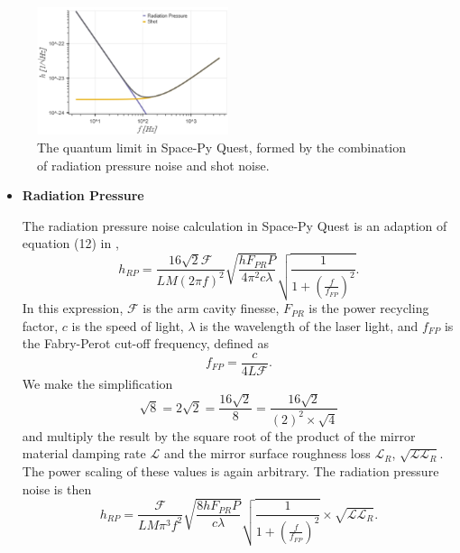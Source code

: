 \documentclass{article}
\begin{document}
\begin{itemize}
    \begin{figure}[h!]
    \centering
    \includegraphics[width=0.5\textwidth]{SPQ_aLIGO_quantum.pdf}
    \caption{The quantum limit in Space-Py Quest, formed by the combination of radiation pressure noise and shot noise.}
    \label{fig:quantum}
    \end{figure}
    \begin{itemize}
        \item \textbf{Radiation Pressure} \par
    The radiation pressure noise calculation in Space-Py Quest is an adaption of equation (12) in \cite{VIRGO}, 
    \[
    h_{RP} = \frac{16\sqrt{2}\mathcal{F}}{LM(2\pi f)^2}\sqrt{\frac{hF_{PR}P}{4\pi^2c\lambda}}\sqrt{\frac{1}{1 + \left(\frac{f}{f_{FP}}\right)^2}}.
    \]
    In this expression, $\mathcal{F}$ is the arm cavity finesse, $F_{PR}$ is the power recycling factor, $c$ is the speed of light, $\lambda$ is the wavelength of the laser light, and $f_{FP}$ is the Fabry-Perot cut-off frequency, defined as
    \begin{equation}
        f_{FP} = \frac{c}{4L\mathcal{F}}.
    \end{equation}
    We make the simplification
    \[
    \sqrt{8} = 2\sqrt{2} = \frac{16 \sqrt{2}}{8} = \frac{16 \sqrt{2}}{(2)^2 \times \sqrt{4}}
    \]
   and multiply the result by the square root of the product of the mirror material damping rate $\mathcal{L}$ and the mirror surface roughness loss $\mathcal{L}_R$, $\sqrt{\mathcal{L}\mathcal{L}_R}$. The power scaling of these values is again arbitrary. The radiation pressure noise is then
    \begin{equation}
    \label{eqn::radiation}
    h_{RP} = \frac{\mathcal{F}}{LM\pi^3f^2}\sqrt{\frac{8hF_{PR}P}{c\lambda}}\sqrt{\frac{1}{1 + \left(\frac{f}{f_{FP}}\right)^2}} \times \sqrt{\mathcal{L}\mathcal{L}_R}.
    \end{equation}
  

\end{itemize}
\end{itemize}
\end{document}
